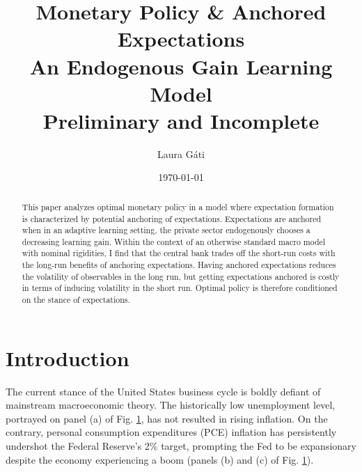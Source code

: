 \documentclass[11pt]{article}
\def \myFigPath {../../figures/}
\renewcommand{\[}{\begin{equation}}
\renewcommand{\]}{\end{equation}}
\def\mySmallerFigScale{0.18}
\begin{document}
\title{Monetary Policy \& Anchored Expectations \\
An Endogenous Gain Learning Model \\
\vspace{0.8cm}
\small{Preliminary and Incomplete}}
\author{Laura G\'ati} 
\date{\today}
\maketitle


\begin{abstract}
This paper analyzes optimal monetary policy in a model where expectation formation is characterized by potential anchoring of expectations. Expectations are anchored when in an adaptive learning setting, the private sector endogenously chooses a decreasing learning gain. Within the context of an otherwise standard macro model with nominal rigidities, I find that the central bank trades off the short-run costs with the long-run benefits of anchoring expectations. Having anchored expectations reduces the volatility of observables in the long run, but getting expectations anchored is costly in terms of inducing volatility in the short run. Optimal policy is therefore conditioned on the stance of expectations.   
\end{abstract}



\newpage
\section{Introduction}\label{introduction}

The current stance of the United States business cycle is boldly defiant of mainstream macroeconomic theory. The historically low unemployment level, portrayed on panel (a) of Fig. \ref{urate_pce_ffr}, has not resulted in rising inflation. On the contrary, personal consumption expenditures (PCE) inflation has persistently undershot the Federal Reserve's 2\% target, prompting the Fed to be expansionary despite the economy experiencing a boom (panels (b) and (c) of Fig. \ref{urate_pce_ffr}).

\begin{figure}[h!]
\caption{}
\label{urate_pce_ffr}
\end{figure}
\end{document}
